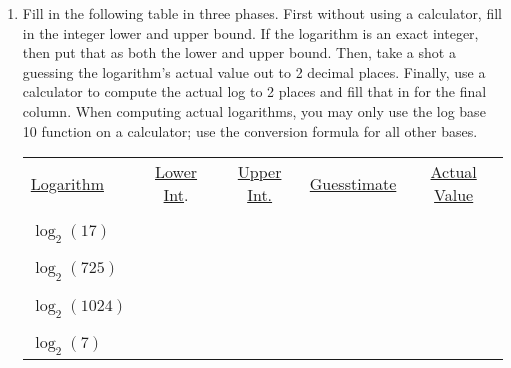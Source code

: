\documentclass[10pt]{article}
\begin{document}
\begin{enumerate}
\newpage \thispagestyle{empty}

\item Fill in the following table in three phases. First without using a calculator, fill in the integer lower and upper bound. If the logarithm is an exact integer, then put that as both the lower and upper bound. Then, take a shot a guessing the logarithm's actual value out to 2 decimal places. Finally, use a calculator to compute the actual log to 2 places and fill that in for the final column. When computing actual logarithms, you may only use the log base 10 function on a calculator; use the conversion formula for all other bases.

\begin{center}
\begin{tabular}{lcccc}
\underline{Logarithm} & \underline{Lower Int}. & \underline{Upper Int.} &
  \underline{Guesstimate} & \underline{Actual Value} \\
& & & & \\ & & & & \\
$\log_2(17)$ & \underline{\hspace{1in}} & \underline{\hspace{1in}} & \underline{\hspace{1in}}  & \underline{\hspace{1in}} \\
& & & & \\ & & & & \\
$\log_2(725)$  & \underline{\hspace{1in}} & \underline{\hspace{1in}} & \underline{\hspace{1in}}  & \underline{\hspace{1in}} \\
& & & & \\ & & & & \\
$\log_2(1024)$ & \underline{\hspace{1in}} & \underline{\hspace{1in}} & \underline{\hspace{1in}}  & \underline{\hspace{1in}} \\
 & & & & \\ & & & & \\
$\log_2(7)$ & \underline{\hspace{1in}} & \underline{\hspace{1in}} & \underline{\hspace{1in}}  & \underline{\hspace{1in}} \\

\end{tabular}
\end{center}
\end{enumerate}
\end{document}
